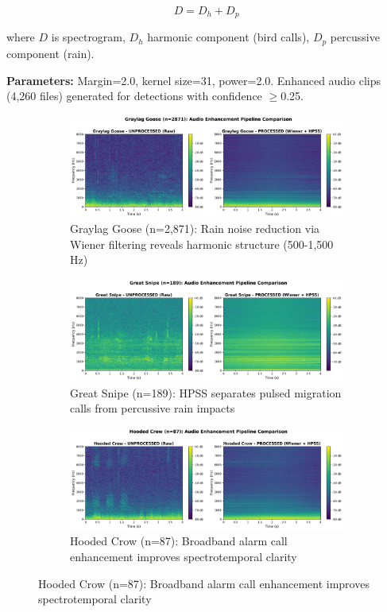 \documentclass[twocolumn]{article}
\begin{document}
\begin{equation}
D = D_h + D_p
\label{eq:hpss}
\end{equation}

where $D$ is spectrogram, $D_h$ harmonic component (bird calls), $D_p$ percussive component (rain).

\textbf{Parameters:} Margin=2.0, kernel size=31, power=2.0. Enhanced audio clips (4,260 files) generated for detections with confidence $\geq$0.25.

\begin{figure}[p]
\centering
\begin{subfigure}{0.78\textwidth}
\centering
\includegraphics[width=\textwidth]{figures/comparison_graylag_goose.png}
\caption{Graylag Goose (n=2,871): Rain noise reduction via Wiener filtering reveals harmonic structure (500-1,500 Hz)}
\end{subfigure}

\vspace{0.8cm}

\begin{subfigure}{0.78\textwidth}
\centering
\includegraphics[width=\textwidth]{figures/comparison_great_snipe.png}
\caption{Great Snipe (n=189): HPSS separates pulsed migration calls from percussive rain impacts}
\end{subfigure}

\vspace{0.8cm}

\begin{subfigure}{0.78\textwidth}
\centering
\includegraphics[width=\textwidth]{figures/comparison_hooded_crow.png}
\caption{Hooded Crow (n=87): Broadband alarm call enhancement improves spectrotemporal clarity}
\end{subfigure}


\end{figure}
\end{document}
